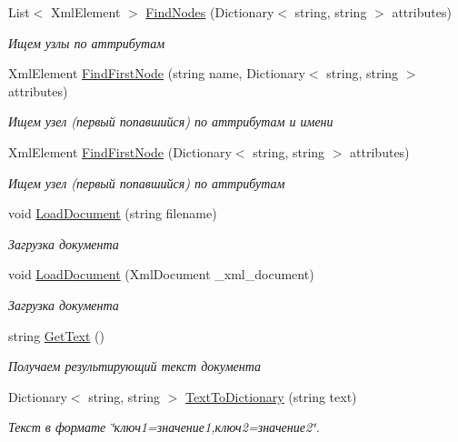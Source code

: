\begin{DoxyCompactItemize}
\item 
List$<$ XmlElement $>$ \hyperlink{class_amusing_xml_1_1_xml_fun_a66e3ece0c48aba2804f97225de4ff3e6}{FindNodes} (Dictionary$<$ string, string $>$ attributes)
\begin{DoxyCompactList}\small\item\em Ищем узлы по аттрибутам \item\end{DoxyCompactList}\item 
XmlElement \hyperlink{class_amusing_xml_1_1_xml_fun_a7fedbc8fb6aa359371642db4a34247d2}{FindFirstNode} (string name, Dictionary$<$ string, string $>$ attributes)
\begin{DoxyCompactList}\small\item\em Ищем узел (первый попавшийся) по аттрибутам и имени \item\end{DoxyCompactList}\item 
XmlElement \hyperlink{class_amusing_xml_1_1_xml_fun_ac369e59fe25313a47b2b20de76fa91d7}{FindFirstNode} (Dictionary$<$ string, string $>$ attributes)
\begin{DoxyCompactList}\small\item\em Ищем узел (первый попавшийся) по аттрибутам \item\end{DoxyCompactList}\item 
void \hyperlink{class_amusing_xml_1_1_xml_fun_a830329f1f25c07eefa1b54cf3e32c34a}{LoadDocument} (string filename)
\begin{DoxyCompactList}\small\item\em Загрузка документа \item\end{DoxyCompactList}\item 
void \hyperlink{class_amusing_xml_1_1_xml_fun_af52d8876c4b5458e49afcbc147ddef9a}{LoadDocument} (XmlDocument \_\-xml\_\-document)
\begin{DoxyCompactList}\small\item\em Загрузка документа \item\end{DoxyCompactList}\item 
string \hyperlink{class_amusing_xml_1_1_xml_fun_a624ddab24e9256a20945cfb199058f3b}{GetText} ()
\begin{DoxyCompactList}\small\item\em Получаем результирующий текст документа \item\end{DoxyCompactList}\item 
Dictionary$<$ string, string $>$ \hyperlink{class_amusing_xml_1_1_xml_fun_ad4e0027abad182d24a1c632b8d4f34b4}{TextToDictionary} (string text)
\begin{DoxyCompactList}\small\item\em Текст в формате \char`\"{}ключ1=значение1,ключ2=значение2\char`\"{}. \item\end{DoxyCompactList}\end{DoxyCompactItemize}
